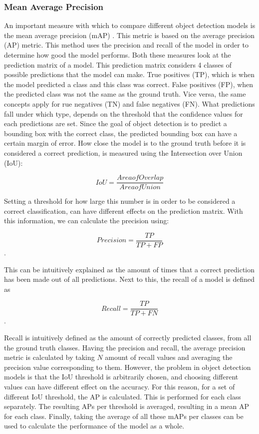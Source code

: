 \subsubsection{Mean Average Precision}
An important measure with which to compare different object detection models is 
the mean average precision (mAP) \cite{mAP}. This metric is based on the average 
precision (AP) metric. This method uses the precision and recall of the model 
in order to determine how good the model performs. Both these measures look 
at the prediction matrix of a model. This prediction matrix considers 4 classes 
of possible predictions that the model can make. True positives (TP), which is when 
the model predicted a class and this class was correct. False positives (FP), when the 
predicted class was not the same as the ground truth. Vice versa, the same concepts 
apply for rue negatives (TN) and false negatives (FN). What predictions fall under 
which type, depends on the threshold that the confidence values for each predictions 
are set. Since the goal of object detection is to predict a bounding box with the 
correct class, the predicted bounding box can have a certain margin of error. How 
close the model is to the ground truth before it is considered a correct prediction, 
is measured using the Intersection over Union (IoU):

\begin{equation}
    IoU = \frac{Area of Overlap}{Area of Union}
\end{equation}

Setting a threshold for how large this number is in order to be considered a 
correct classification, can have different effects on the prediction matrix. 
With this information, we can calculate the precision using: 

\begin{equation}
    Precision = \frac{TP}{TP + FP}
\end{equation}.

This can be intuitively explained as the amount of times that a correct prediction 
has been made out of all predictions. Next to this, the recall of a model is defined as 

\begin{equation}
    Recall = \frac{TP}{TP + FN}
\end{equation}.

Recall is intuitively defined as the amount of correctly predicted classes, 
from all the ground truth classes. Having the precision and recall, the average 
precision metric is calculated by taking $N$ amount of recall values and averaging 
the precision value corresponding to them. However, the problem in object detection 
models is that the IoU threshold is arbitrarily chosen, and choosing different 
values can have different effect on the accuracy. For this reason, for a set of 
different IoU threshold, the AP is calculated. This is performed for each class separately.
The resulting APs per threshold is averaged, resulting in a mean AP for each class. 
Finally, taking the average of all these mAPs per classes can be used to calculate the 
performance of the model as a whole. 

